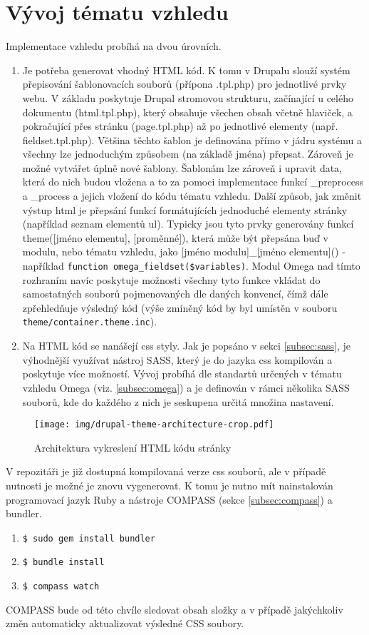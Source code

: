 \section{Vývoj tématu vzhledu}
Implementace vzhledu probíhá na dvou úrovních. 
\begin{enumerate}
  \item Je potřeba generovat vhodný HTML kód. K tomu v Drupalu slouží systém přepisování šablonovacích souborů (přípona .tpl.php) pro jednotlivé prvky webu. V základu poskytuje Drupal stromovou strukturu, začínající u celého dokumentu (html.tpl.php), který obsahuje všechen obsah včetně hlaviček, a pokračující přes stránku (page.tpl.php) až po jednotlivé elementy (např. fieldset.tpl.php). Většina těchto šablon je definována přímo v jádru systému a všechny lze jednoduchým způsobem (na základě jména) přepsat. Zároveň je možné vytvářet úplně nové šablony. Šablonám lze zároveň i upravit data, která do nich budou vložena a to za pomoci implementace funkcí \_preprocess a \_process a jejich vložení do kódu tématu vzhledu. 
  Další způsob, jak změnit výstup html je přepsání funkcí formátujících jednoduché elementy stránky (například seznam elementů ul). Typicky jsou tyto prvky generovány funkcí theme([jméno elementu], [proměnné]), která může být přepsána buď v modulu, nebo tématu vzhledu, jako [jméno modulu]\_[jméno elementu]() - například \texttt{function omega\_fieldset(\$variables)}. Modul Omega nad tímto rozhraním navíc poskytuje možnosti všechny tyto funkce vkládat do samostatných souborů pojmenovaných dle daných konvencí, čímž dále zpřehledňuje výsledný kód (výše zmíněný kód by byl umístěn v souboru \texttt{theme/container.theme.inc}).
  \item Na HTML kód se nanášejí \gls{css} styly. Jak je popsáno v sekci \ref{subsec:sass}, je výhodnější využívat nástroj SASS, který je do jazyka \gls{css} kompilován a poskytuje více možností. Vývoj probíhá dle standartů určených v tématu vzhledu Omega (viz. \ref{subsec:omega}) a je definován v rámci několika SASS souborů, kde do každého z nich je seskupena určitá množina nastavení.
\end{enumerate}

\begin{figure}[]
  \texttt{[image: img/drupal-theme-architecture-crop.pdf]}
  \caption{Architektura vykreslení HTML kódu stránky}
  \label{fig:theme_architecture}
\end{figure}  

V repozitáři je již dostupná kompilovaná verze \gls{css} souborů, ale v případě nutnosti je možné je znovu vygenerovat. K tomu je nutno mít nainstalován programovací jazyk Ruby a nástroje COMPASS (sekce \ref{subsec:compass}) a \gls{bundler}.

\begin{enumerate}
  \item \texttt{\$ sudo gem install bundler}
  \item \texttt{\$ bundle install}
  \item \texttt{\$ compass watch}
\end{enumerate}

COMPASS bude od této chvíle sledovat obsah složky a v případě jakýchkoliv změn automaticky aktualizovat výsledné CSS soubory.
